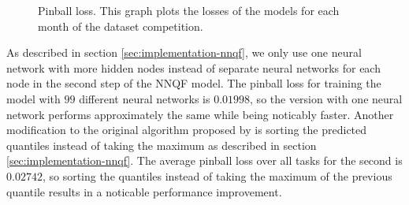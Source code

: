 \begin{figure}[ht]
    \centering
    
    \caption[Pinball loss]{Pinball loss. 
    This graph plots the losses of the models for each month of the dataset competition.}
    \label{fig:pinball-loss}
\end{figure}

As described in section \ref{sec:implementation-nnqf}, 
we only use one neural network with more hidden nodes instead of 
separate neural networks for each node in the second step of the NNQF model. 
The pinball loss for training the model with \(99\) different neural networks 
is \(0.01998\), so the version with one neural network performs approximately the 
same while being noticably faster. 
Another modification to the original algorithm proposed by \Textcite{Ordiano2019} 
is sorting the predicted quantiles instead of taking the maximum as described in 
section \ref{sec:implementation-nnqf}. The average pinball loss over all tasks for the second is 
\(0.02742\), so sorting the quantiles instead of taking the maximum of the previous quantile 
results in a noticable performance improvement.